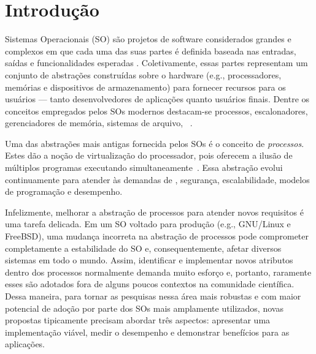 \chapter{Introdução}
\label{cap:introducao}

Sistemas Operacionais (SO) são projetos de software considerados grandes e
complexos em que cada uma das suas partes é  definida baseada nas
entradas, saídas e funcionalidades esperadas \citep{silberschatz}. Coletivamente, essas
partes representam um conjunto de abstrações construídas sobre o hardware
(e.g., processadores, memórias e dispositivos de armazenamento) para fornecer
recursos para os usuários --- tanto desenvolvedores de aplicações quanto usuários finais. Dentre os conceitos empregados pelos SOs modernos
destacam-se processos, escalonadores, gerenciadores de memória, sistemas de
arquivo, ~\citep{tanenbaum}.


Uma das abstrações mais antigas fornecida pelos SOs é o conceito de
\textit{processos}. Estes dão a noção de virtualização do processador, pois
oferecem a ilusão de múltiplos programas executando
simultaneamente~\citep{love, tanenbaum}. Essa abstração evolui continuamente
para atender às demandas de , segurança, escalabilidade, modelos de
programação e desempenho.

Infelizmente, melhorar a abstração de processos para atender novos requisitos é
uma tarefa delicada. Em um SO voltado para produção (e.g., GNU/Linux e
FreeBSD), uma mudança incorreta na abstração de processos pode comprometer
completamente a estabilidade do SO e, consequentemente, afetar diversos sistemas em
todo o mundo. Assim, identificar e implementar novos atributos dentro dos
processos normalmente demanda muito esforço e, portanto, raramente esses são
adotados fora de alguns poucos contextos na comunidade científica. Dessa
maneira, para tornar as pesquisas nessa área mais robustas e com maior
potencial de adoção por parte dos SOs mais amplamente utilizados, novas propostas tipicamente
precisam abordar três aspectos: apresentar uma implementação viável,
medir o desempenho e demonstrar benefícios para as aplicações.

